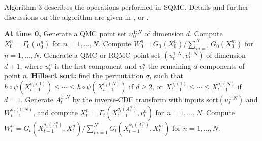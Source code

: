 
Algorithm 3 describes the operations performed in SQMC. Details and further discussions on the algorithm are given in \citet{chopingerber2015sqmc}, \citet{chopingerber2017sqmcintroduction} or \citet{chopinpapaspiliopoulos020introtosmc}.

\begin{algorithm}[t]
\caption{SQMC}
\label{alg:sqmc}
\begin{algorithmic}[1]
\State \textbf{At time 0,}
\State Generate a QMC point set $u_0^{1:N}$ of dimension $d$.
\State Compute $X_0^n = \Gamma_0(u_0^n)$ for $n = 1, \ldots, N$.
\State Compute $W_0^n = G_0(X_0^n) / \sum_{m=1}^N G_0(X_0^m)$ for $n = 1, \ldots, N$.
    \State Generate a QMC or RQMC point set $(u_t^{1:N}, v_t^{1:N})$ of dimension $d+1$, where $u_t^n$ is the first component and $v_t^n$ the remaining $d$ components of point $n$.
    \State \textbf{Hilbert sort:} find the permutation $\sigma_t$ such that $h \circ \psi(X_{t-1}^{\sigma_t(1)}) \leq \cdots \leq h \circ \psi(X_{t-1}^{\sigma_t(N)})$ if $d \geq 2$, or $X_{t-1}^{\sigma_t(1)} \leq \cdots \leq X_{t-1}^{\sigma_t(N)}$ if $d = 1$.
    \State Generate $A_t^{1:N}$ by the inverse-CDF transform with inputs $\mathrm{sort}(u_t^{1:N})$ and $W_{t-1}^{\sigma_t(1:N)}$, and compute $X_t^n = \Gamma_t(X_{t-1}^{\sigma_t(A_t^n)}, v_t^n)$ for $n = 1, \ldots, N$.
    \State Compute $W_t^n = G_t(X_{t-1}^{\sigma_t(A_t^n)}, X_t^n) / \sum_{m=1}^N G_t(X_{t-1}^{\sigma_t(A_t^m)}, X_t^m)$ for $n = 1, \ldots, N$.
\EndFor
\end{algorithmic}
\end{algorithm}


